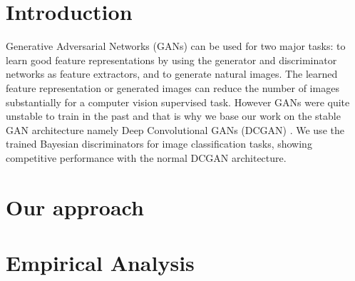 \section{Introduction}
Generative Adversarial Networks (GANs) \cite{goodfellow2014generative} can be used for two major tasks: to learn good feature representations by using the generator and discriminator networks as feature extractors, and to generate natural images. The learned feature representation or generated images can reduce the number of images substantially for a computer vision supervised task. However GANs were quite unstable to train in the past and that is why we base our work on the stable GAN architecture namely Deep Convolutional GANs (DCGAN) \cite{DBLP:journals/corr/RadfordMC15}. We use the trained Bayesian discriminators for image classification tasks, showing competitive performance with the normal DCGAN architecture.

\section{Our approach}
\section{Empirical Analysis}




